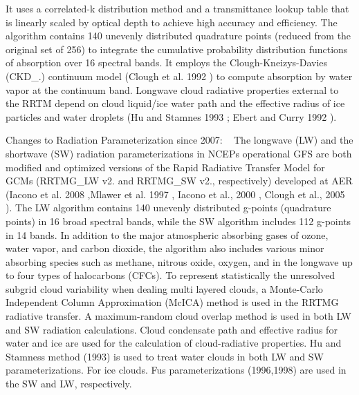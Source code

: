 It uses a correlated-\/k distribution method and a transmittance lookup table that is linearly scaled by optical depth to achieve high accuracy and efficiency. The algorithm contains 140 unevenly distributed quadrature points (reduced from the original set of 256) to integrate the cumulative probability distribution functions of absorption over 16 spectral bands. It employs the Clough-\/\+Kneizys-\/\+Davies (C\+K\+D\+\_.) continuum model (Clough et al. 1992 \cite{clough_et_al_1992}) to compute absorption by water vapor at the continuum band. Longwave cloud radiative properties external to the R\+R\+TM depend on cloud liquid/ice water path and the effective radius of ice particles and water droplets (Hu and Stamnes 1993 \cite{hu_and_stamnes_1993}; Ebert and Curry 1992 \cite{ebert_and_curry_1992}).

Changes to Radiation Parameterization since 2007\+: ~\newline
 The longwave (LW) and the shortwave (SW) radiation parameterizations in N\+C\+EP\textquotesingle{}s operational G\+FS are both modified and optimized versions of the Rapid Radiative Transfer Model for G\+C\+Ms (R\+R\+T\+M\+G\+\_\+\+LW v2. and R\+R\+T\+M\+G\+\_\+\+SW v2., respectively) developed at A\+ER (Iacono et al. 2008 \cite{iacono_et_al_2008},Mlawer et al. 1997 \cite{mlawer_et_al_1997}, Iacono et al., 2000 \cite{iacono_et_al_2000}, Clough et al., 2005 \cite{clough_et_al_2005}). The LW algorithm contains 140 unevenly distributed g-\/points (quadrature points) in 16 broad spectral bands, while the SW algorithm includes 112 g-\/points in 14 bands. In addition to the major atmospheric absorbing gases of ozone, water vapor, and carbon dioxide, the algorithm also includes various minor absorbing species such as methane, nitrous oxide, oxygen, and in the longwave up to four types of halocarbons (C\+F\+Cs). To represent statistically the unresolved subgrid cloud variability when dealing multi layered clouds, a Monte-\/\+Carlo Independent Column Approximation (Mc\+I\+CA) method is used in the R\+R\+T\+MG radiative transfer. A maximum-\/random cloud overlap method is used in both LW and SW radiation calculations. Cloud condensate path and effective radius for water and ice are used for the calculation of cloud-\/radiative properties. Hu and Stamnes\textquotesingle{}s method (1993) \cite{hu_and_stamnes_1993} is used to treat water clouds in both LW and SW parameterizations. For ice clouds. Fu\textquotesingle{}s parameterizations (1996,1998) \cite{fu_1996} \cite{fu_et_al_1998} are used in the SW and LW, respectively.

